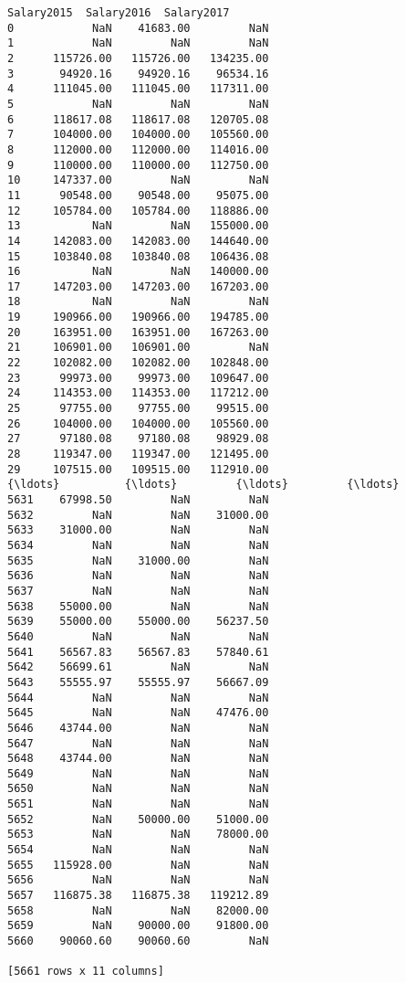 \documentclass[11pt]{article}
\begin{document}
\begin{Verbatim}[commandchars=\\\{\}]
      Salary2015  Salary2016  Salary2017  
0            NaN    41683.00         NaN  
1            NaN         NaN         NaN  
2      115726.00   115726.00   134235.00  
3       94920.16    94920.16    96534.16  
4      111045.00   111045.00   117311.00  
5            NaN         NaN         NaN  
6      118617.08   118617.08   120705.08  
7      104000.00   104000.00   105560.00  
8      112000.00   112000.00   114016.00  
9      110000.00   110000.00   112750.00  
10     147337.00         NaN         NaN  
11      90548.00    90548.00    95075.00  
12     105784.00   105784.00   118886.00  
13           NaN         NaN   155000.00  
14     142083.00   142083.00   144640.00  
15     103840.08   103840.08   106436.08  
16           NaN         NaN   140000.00  
17     147203.00   147203.00   167203.00  
18           NaN         NaN         NaN  
19     190966.00   190966.00   194785.00  
20     163951.00   163951.00   167263.00  
21     106901.00   106901.00         NaN  
22     102082.00   102082.00   102848.00  
23      99973.00    99973.00   109647.00  
24     114353.00   114353.00   117212.00  
25      97755.00    97755.00    99515.00  
26     104000.00   104000.00   105560.00  
27      97180.08    97180.08    98929.08  
28     119347.00   119347.00   121495.00  
29     107515.00   109515.00   112910.00  
{\ldots}          {\ldots}         {\ldots}         {\ldots}  
5631    67998.50         NaN         NaN  
5632         NaN         NaN    31000.00  
5633    31000.00         NaN         NaN  
5634         NaN         NaN         NaN  
5635         NaN    31000.00         NaN  
5636         NaN         NaN         NaN  
5637         NaN         NaN         NaN  
5638    55000.00         NaN         NaN  
5639    55000.00    55000.00    56237.50  
5640         NaN         NaN         NaN  
5641    56567.83    56567.83    57840.61  
5642    56699.61         NaN         NaN  
5643    55555.97    55555.97    56667.09  
5644         NaN         NaN         NaN  
5645         NaN         NaN    47476.00  
5646    43744.00         NaN         NaN  
5647         NaN         NaN         NaN  
5648    43744.00         NaN         NaN  
5649         NaN         NaN         NaN  
5650         NaN         NaN         NaN  
5651         NaN         NaN         NaN  
5652         NaN    50000.00    51000.00  
5653         NaN         NaN    78000.00  
5654         NaN         NaN         NaN  
5655   115928.00         NaN         NaN  
5656         NaN         NaN         NaN  
5657   116875.38   116875.38   119212.89  
5658         NaN         NaN    82000.00  
5659         NaN    90000.00    91800.00  
5660    90060.60    90060.60         NaN  

[5661 rows x 11 columns]

    \end{Verbatim}
\end{document}
